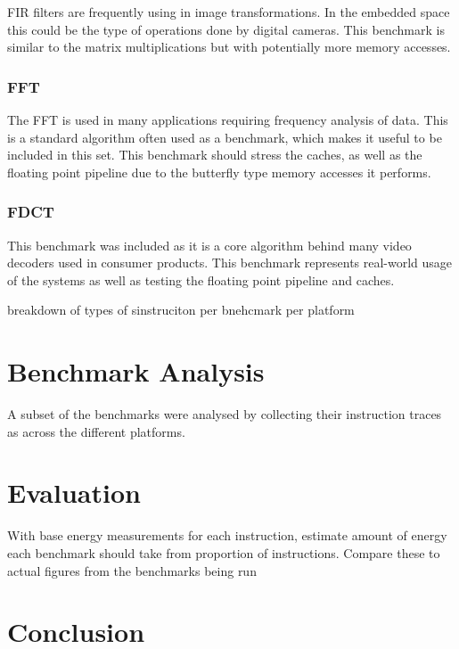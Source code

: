 \documentclass[twocolumn]{article}
\newcommand{\nsection}[1]{\section{\bfseries #1}}
\begin{document}
FIR filters are frequently using in image transformations. In the embedded space this could be the type of operations done by digital cameras. This benchmark is similar to the matrix multiplications but with potentially more memory accesses.

\subsubsection*{FFT}

The FFT is used in many applications requiring frequency analysis of data. This is a standard algorithm often used as a benchmark, which makes it useful to be included in this set. This benchmark should stress the caches, as well as the floating point pipeline due to the butterfly type memory accesses it performs.

\subsubsection*{FDCT}

This benchmark was included as it is a core algorithm behind many video decoders used in consumer products. This benchmark represents real-world usage of the systems as well as testing the floating point pipeline and caches.


breakdown of types of sinstruciton per bnehcmark per platform

\nsection{Benchmark Analysis}

A subset of the benchmarks were analysed by collecting their instruction traces as across the different platforms.

\nsection{Evaluation}

With base energy measurements for each instruction, estimate amount of energy each benchmark should take from proportion of instructions. Compare these to actual figures from the benchmarks being run

\nsection{Conclusion}

\printbibliography
\end{document}
